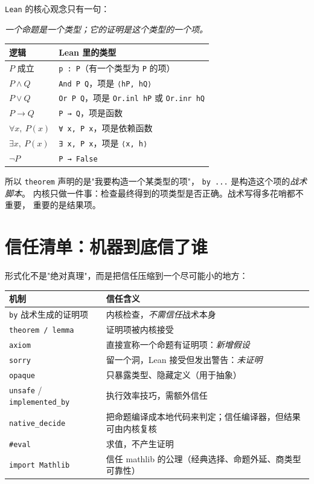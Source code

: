\texttt{Lean} 的核心观念只有一句：
\begin{center}\emph{一个命题是一个类型；它的证明是这个类型的一个项。}\end{center}

\begin{center}\small
\begin{tabular}{@{}ll@{}}
\toprule
\textbf{逻辑} & \textbf{Lean 里的类型}\\
\midrule
$P$ 成立 & \texttt{p : P}（有一个类型为 \texttt{P} 的项）\\
$P\land Q$ & \texttt{And P Q}，项是 \texttt{⟨hP, hQ⟩}\\
$P\lor Q$ & \texttt{Or P Q}，项是 \texttt{Or.inl hP} 或 \texttt{Or.inr hQ}\\
$P\to Q$ & \texttt{P → Q}，项是函数\\
$\forall x,\ P(x)$ & \texttt{∀ x, P x}，项是依赖函数\\
$\exists x,\ P(x)$ & \texttt{∃ x, P x}，项是 \texttt{⟨x, h⟩}\\
$\neg P$ & \texttt{P → False}\\
\bottomrule
\end{tabular}
\end{center}

所以 \texttt{theorem} 声明的是"我要构造一个某类型的项"，
\texttt{by ...} 是构造这个项的\emph{战术脚本}。
内核只做一件事：检查最终得到的项类型是否正确。战术写得多花哨都不重要，
重要的是结果项。

\section{信任清单：机器到底信了谁}
\label{sec:06-trust}

形式化不是"绝对真理"，而是把信任压缩到一个尽可能小的地方：

\begin{center}\small
\begin{tabular}{@{}p{}p{}@{}}
\toprule
\textbf{机制} & \textbf{信任含义}\\
\midrule
\texttt{by} 战术生成的证明项 & 内核检查，\emph{不需信任}战术本身\\
\texttt{theorem / lemma} & 证明项被内核接受\\
\texttt{axiom} & 直接宣称一个命题有证明项：\emph{新增假设}\\
\texttt{sorry} & 留一个洞，Lean 接受但发出警告：\emph{未证明}\\
\texttt{opaque} & 只暴露类型、隐藏定义（用于抽象）\\
\texttt{unsafe} / \texttt{implemented\_by} & 执行效率技巧，需额外信任\\
\texttt{native\_decide} & 把命题编译成本地代码来判定；信任编译器，但结果可由内核复核\\
\texttt{\#eval} & 求值，不产生证明\\
\texttt{import Mathlib} & 信任 mathlib 的公理（经典选择、命题外延、商类型可靠性）\\
\bottomrule
\end{tabular}
\end{center}

